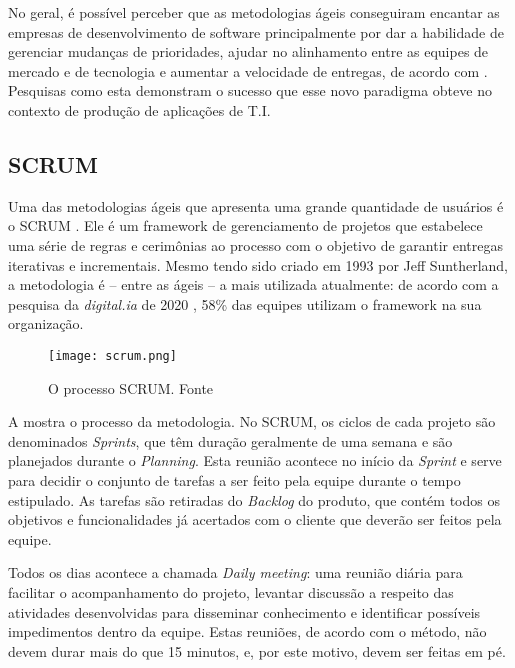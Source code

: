 No geral, é possível perceber que as metodologias ágeis conseguiram encantar as empresas de desenvolvimento de software principalmente por dar a habilidade de gerenciar mudanças de prioridades, ajudar no alinhamento entre as equipes de mercado e de tecnologia e aumentar a velocidade de entregas, de acordo com \cite{stateAgileReport2020}. Pesquisas como esta demonstram o sucesso que esse novo paradigma obteve no contexto de produção de aplicações de T.I. 

\vspace{3mm}
\subsection{SCRUM}
Uma das metodologias ágeis que apresenta uma grande quantidade de usuários é o SCRUM \cite{scrumBook}. Ele é um framework de gerenciamento de projetos que estabelece uma série de regras e cerimônias ao processo com o objetivo de garantir entregas iterativas e incrementais. Mesmo tendo sido criado em 1993 por Jeff Suntherland, a metodologia é -- entre as ágeis -- a mais utilizada atualmente: de acordo com a pesquisa da \emph{digital.ia} de 2020 \cite{stateAgileReport2020}, 58\% das equipes utilizam o framework na sua organização.

\begin{figure}[ht]
\begin{center}
\texttt{[image: scrum.png]}
\end{center}
\caption[O processo SCRUM]{
    O processo SCRUM. Fonte \cite{fotoScrum}
}\label{scrum}
\end{figure}

A  mostra o processo da metodologia. No SCRUM, os ciclos de cada projeto são denominados \emph{Sprints}, que têm duração geralmente de uma semana e são planejados durante o \emph{Planning}. Esta reunião acontece no início da \emph{Sprint} e serve para decidir o conjunto de tarefas a ser feito pela equipe durante o tempo estipulado. As tarefas são retiradas do \emph{Backlog} do produto, que contém todos os objetivos e funcionalidades já acertados com o cliente que deverão ser feitos pela equipe.

Todos os dias acontece a chamada \emph{Daily meeting}: uma reunião diária para facilitar o acompanhamento do projeto, levantar discussão a respeito das atividades desenvolvidas para disseminar conhecimento e identificar possíveis impedimentos dentro da equipe. Estas reuniões, de acordo com o método, não devem durar mais do que 15 minutos, e, por este motivo, devem ser feitas em pé.

